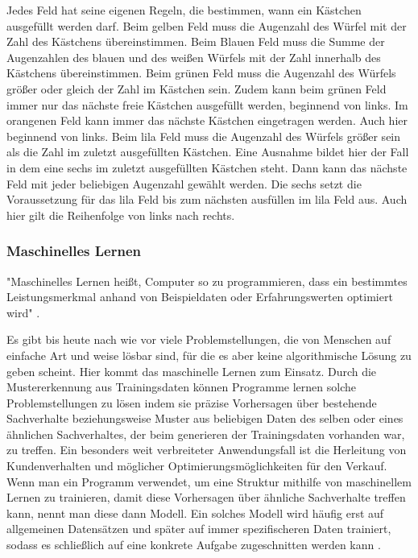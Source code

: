 Jedes Feld hat seine eigenen Regeln, die bestimmen, wann ein Kästchen ausgefüllt werden darf. Beim gelben Feld muss die Augenzahl des Würfel mit der Zahl des Kästchens übereinstimmen. Beim Blauen Feld muss die Summe der Augenzahlen des blauen und des weißen Würfels mit der Zahl innerhalb des Kästchens übereinstimmen. Beim grünen Feld muss die Augenzahl des Würfels größer oder gleich der Zahl im Kästchen sein. Zudem kann beim grünen Feld immer nur das nächste freie Kästchen ausgefüllt werden, beginnend von links. Im orangenen Feld kann immer das nächste Kästchen eingetragen werden. Auch hier beginnend von links. Beim lila Feld muss die Augenzahl des Würfels größer sein als die Zahl im zuletzt ausgefüllten Kästchen. Eine Ausnahme bildet hier der Fall in dem eine sechs im zuletzt ausgefüllten Kästchen steht. Dann kann das nächste Feld mit jeder beliebigen Augenzahl gewählt werden. Die sechs setzt die Voraussetzung für das lila Feld bis zum nächsten ausfüllen im lila Feld aus. Auch hier gilt die Reihenfolge von links nach rechts.
\subsubsection{Maschinelles Lernen}
"Maschinelles Lernen heißt, Computer so zu programmieren, dass ein bestimmtes Leistungsmerkmal anhand von Beispieldaten oder Erfahrungswerten optimiert wird" \cite[Seite 3]{alpaydin_maschinelles_2022}.

Es gibt bis heute nach wie vor viele Problemstellungen, die von Menschen auf einfache Art und weise lösbar sind, für die es aber keine algorithmische Lösung zu geben scheint. Hier kommt das maschinelle Lernen zum Einsatz. Durch die Mustererkennung aus Trainingsdaten können Programme lernen solche Problemstellungen zu lösen indem sie präzise Vorhersagen über bestehende Sachverhalte beziehungsweise Muster aus beliebigen Daten des selben oder eines ähnlichen Sachverhaltes, der beim generieren der Trainingsdaten vorhanden war, zu treffen. Ein besonders weit verbreiteter Anwendungsfall ist die Herleitung von Kundenverhalten und möglicher Optimierungsmöglichkeiten für den Verkauf. Wenn man ein Programm verwendet, um eine Struktur mithilfe von maschinellem Lernen zu trainieren, damit diese Vorhersagen über ähnliche Sachverhalte treffen kann, nennt man diese dann Modell. Ein solches Modell wird häufig erst auf allgemeinen Datensätzen und später auf immer spezifischeren Daten trainiert, sodass es schließlich auf eine konkrete Aufgabe zugeschnitten werden kann \cite[Seite 1f]{alpaydin_maschinelles_2022}.

